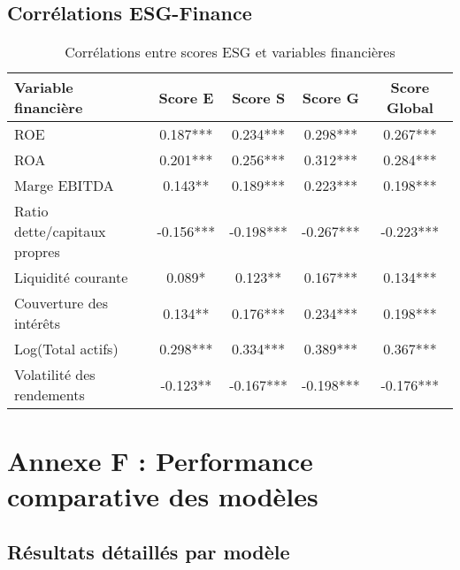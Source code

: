 \subsection{Corrélations ESG-Finance}

\begin{table}[h]
\centering
\begin{tabular}{|l|c|c|c|c|}
\hline
\textbf{Variable financière} & \textbf{Score E} & \textbf{Score S} & \textbf{Score G} & \textbf{Score Global} \\
\hline
ROE & 0.187*** & 0.234*** & 0.298*** & 0.267*** \\
ROA & 0.201*** & 0.256*** & 0.312*** & 0.284*** \\
Marge EBITDA & 0.143** & 0.189*** & 0.223*** & 0.198*** \\
Ratio dette/capitaux propres & -0.156*** & -0.198*** & -0.267*** & -0.223*** \\
Liquidité courante & 0.089* & 0.123** & 0.167*** & 0.134*** \\
Couverture des intérêts & 0.134** & 0.176*** & 0.234*** & 0.198*** \\
Log(Total actifs) & 0.298*** & 0.334*** & 0.389*** & 0.367*** \\
Volatilité des rendements & -0.123** & -0.167*** & -0.198*** & -0.176*** \\
\hline
\end{tabular}
\caption{Corrélations entre scores ESG et variables financières}
\end{table}

\section{Annexe F : Performance comparative des modèles}

\subsection{Résultats détaillés par modèle}

